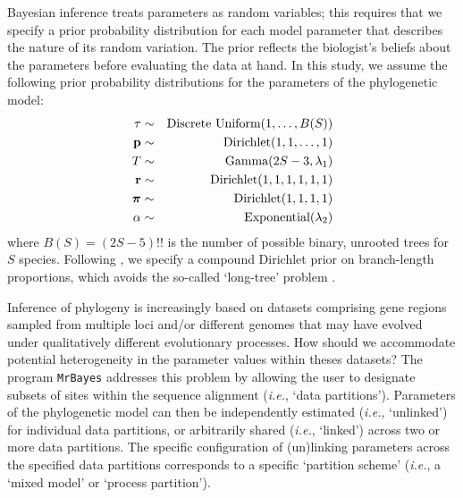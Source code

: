 \documentclass[11pt]{article}
\begin{document}
Bayesian inference treats parameters as random variables; this requires that we specify a prior probability distribution for each model parameter that describes the nature of its random variation.
The prior reflects the biologist's beliefs about the parameters before evaluating the data at hand.
In this study, we assume the following prior probability distributions for the parameters of the phylogenetic model:
\begin{eqnarray*}
\tau & \sim & \mbox{Discrete Uniform}(1, \ldots, B(S)) \\
{\mathbf p} & \sim & \mbox{Dirichlet}(1, 1, \ldots, 1) \\
T & \sim & \mbox{Gamma}(2S-3, \lambda_1) \\
{\mathbf r} & \sim & \mbox{Dirichlet}(1,1,1,1,1,1) \\
\mbox{\boldmath$\pi$\unboldmath} & \sim & \mbox{Dirichlet}(1,1,1,1) \\
\alpha & \sim & \mbox{Exponential}(\lambda_2)
\end{eqnarray*}
where $B(S)=(2S-5)!!$ is the number of possible binary, unrooted trees for $S$ species.
Following \citet[][see also Huelsenbeck and Suchard, 2007]{zhang12}, we specify a compound Dirichlet prior on branch-length proportions, which avoids the so-called `long-tree' problem \citep[{\it sensu} ][]{brown09,rannala12}.

Inference of phylogeny is increasingly based on datasets comprising gene regions sampled from multiple loci and/or different genomes that may have evolved under qualitatively different evolutionary processes. 
How should we accommodate potential heterogeneity in the parameter values within theses datasets?
The program \verb!MrBayes! \citep{ronquist12} addresses this problem by allowing the user to designate subsets of sites within the sequence alignment ({\it i.e.}, `data partitions').
Parameters of the phylogenetic model can then be independently estimated ({\it i.e.}, `unlinked') for individual data partitions, or arbitrarily shared ({\it i.e.}, `linked') across two or more data partitions.
The specific configuration of (un)linking parameters across the specified data partitions corresponds to a specific `partition scheme' ({\it i.e.}, a `mixed model' or `process partition').
\end{document}
